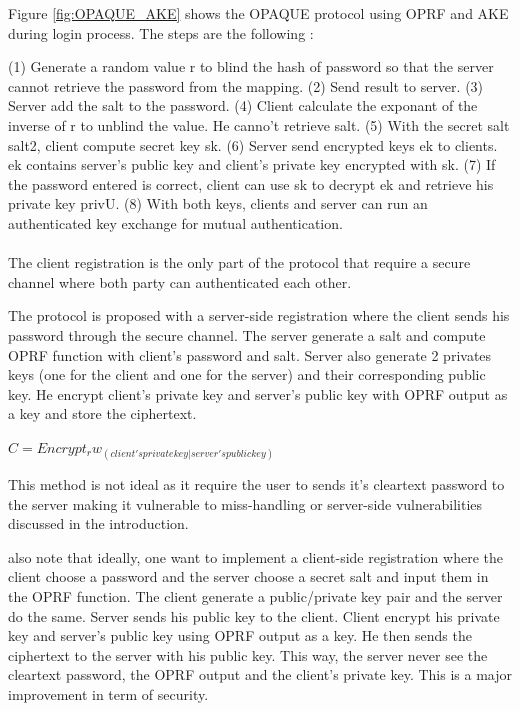 \documentclass[../report.tex]{subfiles}
\begin{document}
Figure \ref{fig:OPAQUE_AKE} shows the OPAQUE protocol using OPRF and AKE during login process.
The steps are the following :

(1) Generate a random value r to blind the hash of password so that the server cannot retrieve the password from the mapping.
(2) Send result to server.
(3) Server add the salt to the password.
(4) Client calculate the exponant of the inverse of r to unblind the value. He canno't retrieve salt.
(5) With the secret salt salt2, client compute secret key sk.
(6) Server send encrypted keys ek to clients. ek contains server's public key and client's private key encrypted with sk.
(7) If the password entered is correct, client can use sk to decrypt ek and retrieve his private key privU.
(8) With both keys, clients and server can run an authenticated key exchange for mutual authentication.


\paragraph{} \label{sec:opaque_register}
The client registration is the only part of the protocol that require a secure channel where both party can authenticated each other.


The protocol is proposed with a server-side registration where the client sends his password through the secure channel. The server generate a salt and compute OPRF function with client's password and salt. Server also generate 2 privates keys (one for the client and one for the server) and their corresponding public key. He encrypt client's private key and server's public key with OPRF output as a key and store the ciphertext.


$C = Encrypt_rw_(client's private key | server's public key)$


This method is not ideal as it require the user to sends it's cleartext password to the server making it vulnerable to miss-handling or server-side vulnerabilities discussed in the introduction.



\cite{OPAQUE_Paper} also note that ideally, one want to implement a client-side registration where the client choose a password and the server choose a secret salt and input them in the OPRF function. The client generate a public/private key pair and the server do the same. Server sends his public key to the client. Client encrypt his private key and server's public key using OPRF output as a key. He then sends the ciphertext to the server with his public key.
This way, the server never see the cleartext password, the OPRF output and the client's private key. This is a major improvement in term of security.
\end{document}
